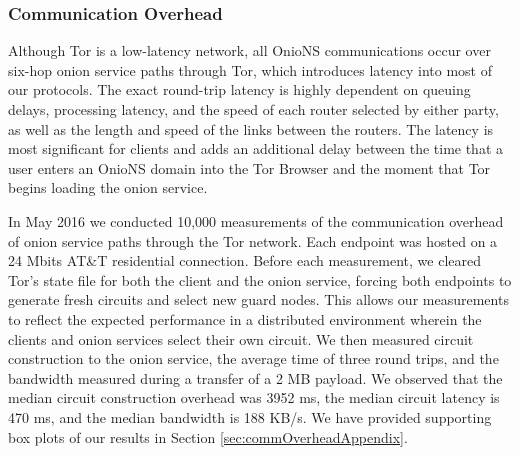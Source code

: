 \documentclass[USenglish,oneside,twocolumn]{article}
\begin{document}

\subsubsection{Communication Overhead}
\label{sec:commOverhead}

Although Tor is a low-latency network, all OnioNS communications occur over six-hop onion service paths through Tor, which introduces latency into most of our protocols. The exact round-trip latency is highly dependent on queuing delays, processing latency, and the speed of each router selected by either party, as well as the length and speed of the links between the routers. The latency is most significant for clients and adds an additional delay between the time that a user enters an OnioNS domain into the Tor Browser and the moment that Tor begins loading the onion service. 

In May 2016 we conducted 10,000 measurements of the communication overhead of onion service paths through the Tor network. Each endpoint was hosted on a 24 Mbits AT\&T residential connection. Before each measurement, we cleared Tor's state file for both the client and the onion service, forcing both endpoints to generate fresh circuits and select new guard nodes. This allows our measurements to reflect the expected performance in a distributed environment wherein the clients and onion services select their own circuit. We then measured circuit construction to the onion service, the average time of three round trips, and the bandwidth measured during a transfer of a 2 MB payload. We observed that the median circuit construction overhead was 3952 ms, the median circuit latency is 470 ms, and the median bandwidth is 188 KB/s. We have provided supporting box plots of our results in Section \ref{sec:commOverheadAppendix}. %
\end{document}
